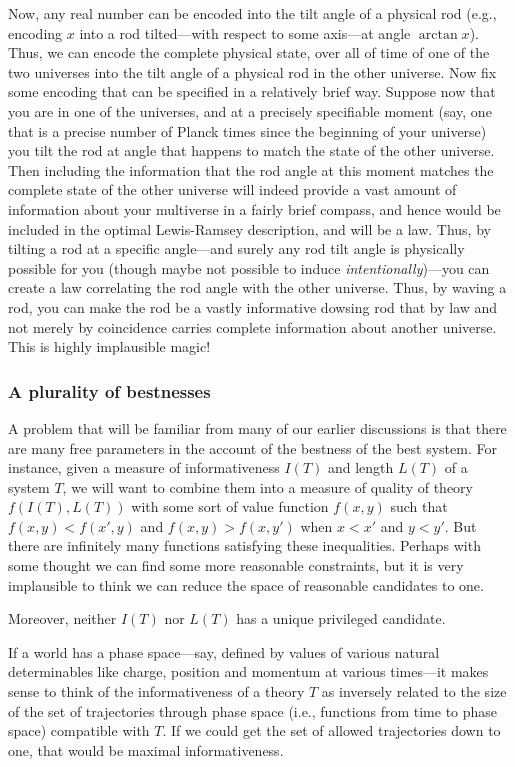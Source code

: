 Now, any real number can be encoded into the tilt angle of a physical rod (e.g., encoding $x$ into a rod tilted---with respect to some
axis---at angle $\arctan x$). Thus, we can encode the complete physical state, over all of time of one of the two universes into the tilt angle of a physical rod
in the other universe. Now fix some encoding that can be specified in a relatively brief way. Suppose now that you are in one of the 
universes, and at a precisely specifiable moment (say, one that is a precise number of Planck times since the beginning of your universe)
you tilt the rod at angle that happens to match the state of the other universe. Then including the information that the 
rod angle at this moment matches the complete state of the other universe will indeed provide a vast amount of information about your 
multiverse in a fairly brief compass, and hence would be included in the optimal Lewis-Ramsey description, and will be a law. Thus, by
tilting a rod at a specific angle---and surely any rod tilt angle is physically possible for you (though maybe not possible to induce
\textit{intentionally})---you can create a law correlating the rod angle with the other universe. Thus, by waving a rod, you can make
the rod be a vastly informative dowsing rod that by law and not merely by coincidence carries complete information about another universe.
This is highly implausible magic!

\subsubsection{A plurality of bestnesses}
A problem that will be familiar from many of our earlier discussions is that there are many free parameters in the account of 
the bestness of the best system. For instance, given a measure of informativeness $I(T)$ and length $L(T)$ of a system
$T$, we will want to combine them into a measure of quality of theory $f(I(T),L(T))$ with some sort of value function $f(x,y)$ such that $f(x,y)<f(x',y)$ 
and $f(x,y)>f(x,y')$ when $x<x'$ and $y<y'$. But there are infinitely many functions satisfying these inequalities. Perhaps
with some thought we can find some more reasonable constraints, but it is very implausible to think we can reduce the space
of reasonable candidates to one.

Moreover, neither $I(T)$ nor $L(T)$ has a unique privileged candidate.

If a world has a phase space---say, defined by values of various natural determinables like charge, position and momentum at various 
times---it makes sense to think of the informativeness of a theory $T$ as inversely related to the size of the set of trajectories through 
phase space (i.e., functions from time to phase space) compatible with $T$. If we could get the set of allowed trajectories down to one,
that would be maximal informativeness. 

